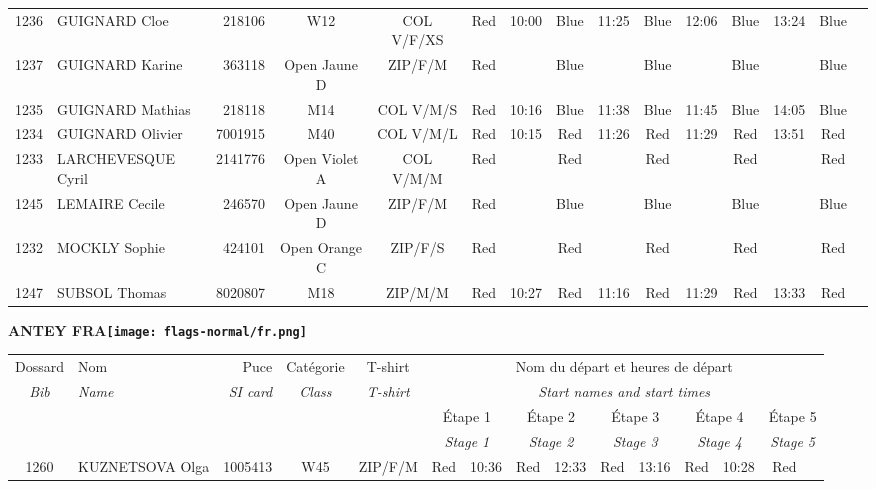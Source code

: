 \documentclass{report}
\begin{document}
\begin{longtable}{|c|l|r|c|c|*{5}{cc|}}
    1236 & GUIGNARD Cloe & 218106 & W12 & COL V/F/XS & Red & 10:00 & Blue & 11:25 & Blue & 12:06 & Blue & 13:24 & Blue &  \\
    1237 & GUIGNARD Karine & 363118 & Open Jaune D & ZIP/F/M & Red &   & Blue &   & Blue &   & Blue &   & Blue &  \\
    1235 & GUIGNARD Mathias & 218118 & M14 & COL V/M/S & Red & 10:16 & Blue & 11:38 & Blue & 11:45 & Blue & 14:05 & Blue &  \\
    1234 & GUIGNARD Olivier & 7001915 & M40 & COL V/M/L & Red & 10:15 & Red & 11:26 & Red & 11:29 & Red & 13:51 & Red &  \\
    1233 & LARCHEVESQUE Cyril & 2141776 & Open Violet A & COL V/M/M & Red &   & Red &   & Red &   & Red &   & Red &  \\
    1245 & LEMAIRE Cecile & 246570 & Open Jaune D & ZIP/F/M & Red &   & Blue &   & Blue &   & Blue &   & Blue &  \\
    1232 & MOCKLY Sophie & 424101 & Open Orange C & ZIP/F/S & Red &   & Red &   & Red &   & Red &   & Red &  \\
    1247 & SUBSOL Thomas & 8020807 & M18 & ZIP/M/M & Red & 10:27 & Red & 11:16 & Red & 11:29 & Red & 13:33 & Red &  \\
  \end{longtable}
\newpage
  \Huge \centering \bfseries ANTEY  FRA\normalfont \footnotesize \sffamily \hfill \texttt{[image: flags-normal/fr.png]} \newline 
  \begin{longtable}{|c|l|r|c|c|*{5}{cc|}}
    Dossard & Nom  & Puce    & Catégorie & T-shirt & \multicolumn{10}{c|}{Nom du départ et heures de départ} \\
    \itshape Bib     & \itshape Name & \itshape SI card & \itshape Class  & \itshape  T-shirt  & \multicolumn{10}{c|}{\itshape Start names and start times} \\
    \hline
    & & & & & \multicolumn{2}{c|}{Étape 1} & \multicolumn{2}{c|}{Étape 2} & \multicolumn{2}{c|}{Étape 3} & \multicolumn{2}{c|}{Étape 4} & \multicolumn{2}{c|}{Étape 5} \\
    & & & & & \multicolumn{2}{c|}{\itshape Stage 1} & \multicolumn{2}{c|}{\itshape Stage 2} & \multicolumn{2}{c|}{\itshape Stage 3} & \multicolumn{2}{c|}{\itshape Stage 4} & \multicolumn{2}{c|}{\itshape Stage 5} \\
    \hline
    1260 & KUZNETSOVA Olga & 1005413 & W45 & ZIP/F/M & Red & 10:36 & Red & 12:33 & Red & 13:16 & Red & 10:28 & Red &  \\
  \end{longtable}
\end{document}
